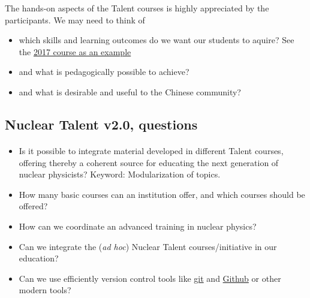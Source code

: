 \documentclass[%
oneside,                 %
final,                   %
10pt]{article}
\begin{document}
The hands-on aspects of the Talent courses is highly appreciated by the participants.  We may need to think of
\begin{itemize}
\item which skills and learning outcomes do we want our students to aquire? See the \href{{https://github.com/NuclearTalent/NuclearStructure}}{2017 course as an example}

\item and what is pedagogically possible to achieve?

\item and what is desirable and useful to the Chinese community? 
\end{itemize}

\noindent








\subsection{Nuclear Talent v2.0, questions}

\paragraph{}
\begin{itemize}
\item Is it possible to integrate material developed in different Talent courses, offering thereby a coherent source for educating the next generation of nuclear physicists? Keyword: Modularization of topics.

\item How many basic courses can an institution offer, and which courses should be offered?

\item How can we  coordinate an advanced training in nuclear physics?

\item Can we integrate the (\emph{ad hoc}) Nuclear Talent courses/initiative  in our education?

\item Can we use efficiently version control tools  like \href{{https://git-scm.com/}}{git} and \href{{https://github.com/}}{Github} or other modern tools? 
\end{itemize}

\noindent
\end{document}
